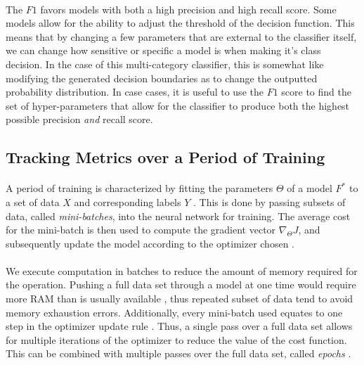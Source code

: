 \documentclass[12pt,letterpaper]{article}
\begin{document}
\paragraph*{}The $F1$ favors models with both a high precision and high recall score. Some models allow for the ability to adjust the threshold of the decision function. This means that by changing a few parameters that are external to the classifier itself, we can change how sensitive or specific a model is when making it's class decision. In the case of this multi-category classifier, this is somewhat like modifying the generated decision boundaries as to change the outputted probability distribution. In case cases, it is useful to use the $F1$ score to find the set of hyper-parameters that allow for the classifier to produce both the highest possible precision \textit{and} recall score.


\subsection{Tracking Metrics over a Period of Training}
\label{subsec-TrainingMetrics}

\paragraph*{}A period of training is characterized by fitting the parameters $\Theta$ of a model $F^*$ to a set of data $X$ and corresponding labels $Y$ \cite{Goodfellow,Virtanen}. This is done by passing subsets of data, called \textit{mini-batches}, into the neural network for training. The average cost for the mini-batch is then used to compute the gradient vector $\nabla_{\Theta}J$, and subsequently update the model according to the optimizer chosen \cite{Geron,Goodfellow}. 

\paragraph{}We execute computation in batches to reduce the amount of memory required for the operation. Pushing a full data set through a model at one time would require more RAM than is usually available , thus repeated subset of data tend to avoid memory exhaustion errors. Additionally, every mini-batch used equates to one step in the optimizer update rule \cite{Goodfellow}. Thus, a single pass over a full data set allows for multiple iterations of the optimizer to reduce the value of the cost function. This can be combined with multiple passes over the full data set, called \textit{epochs} \cite{James,Loy}.
\end{document}

